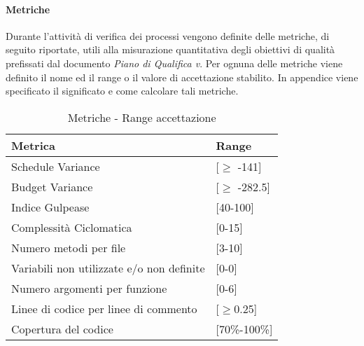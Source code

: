 \paragraph{Metriche}
Durante l'attività di verifica dei processi vengono definite delle metriche, di seguito riportate, utili alla misurazione quantitativa degli obiettivi di qualità prefissati dal documento \emph{Piano di Qualifica v}\VersionePQ. Per ognuna delle metriche viene definito il nome ed il range o il valore di accettazione stabilito. In appendice viene specificato il significato e come calcolare tali metriche.\\
\begin{table}[H]
		\centering
		\begin{tabular}{|p{7cm}|p{2cm}|}
\hline
\textbf{Metrica} & \textbf{Range}\\ \hline
Schedule Variance & [\(\geq\) -141]\\ \hline
Budget Variance & [\(\geq\) -282.5]\\ \hline
Indice Gulpease & [40-100]\\ \hline
Complessità Ciclomatica & [0-15]\\ \hline
Numero metodi per file & [3-10] \\ \hline
Variabili non utilizzate e/o non definite & [0-0] \\ \hline
Numero argomenti per funzione & [0-6]\\ \hline
Linee di codice per linee di commento & [\(\geq\)0.25]\\ \hline
Copertura del codice & [70\%-100\%]\\ \hline
\end{tabular}
\caption {Metriche - Range accettazione}
\end{table}



  

    
      
      
      
      
      

        
        
    

